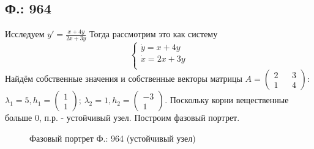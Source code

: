 \documentclass{article}
\begin{document}
\textcolor[rgb]{1,1,1}{ }
\subsection{Ф.: 964}
Исследуем $y'=\frac{x+4y}{2x+3y}$ Тогда рассмотрим это как систему 
\begin{equation}
\begin{cases}
        \dot{y}=x+4y\\
        \dot{x}=2x+3y\\
    \end{cases}    
\end{equation}
Найдём собственные значения и собственные векторы матрицы $A=\begin{pmatrix}2 && 3 \\ 1 && 4 \end{pmatrix}$:\\
 $\lambda_1= 5,h_1 = \begin{pmatrix}1  \\  1 \end{pmatrix} $; $\lambda_2= 1,h_2 = \begin{pmatrix} -3  \\  1 \end{pmatrix} $. Поскольку корни вещественные больше 0, п.р. - устойчивый узел. Построим фазовый портрет.
 \begin{figure}[ht]
\caption{Фазовый портрет Ф.: 964 (устойчивый узел)}
\label{964}
\end{figure}
\end{document}
